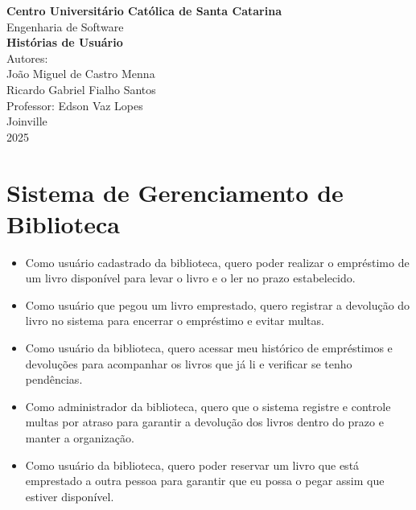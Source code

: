 \documentclass[12pt,a4paper]{article}
\begin{document}
\begin{center}
    \centering

    {\Large \textbf{Centro Universitário Católica de Santa Catarina}}\\[0.5cm]
    {\large Engenharia de Software}\\[4cm]

    {\Huge \textbf{Histórias de Usuário}}\\[0.5cm]

    {\large Autores:}\\[0.5cm]
    {\large João Miguel de Castro Menna}\\[0.5cm]
    {\large Ricardo Gabriel Fialho Santos}\\[4.5cm]

    {\large Professor: Edson Vaz Lopes}\\[0.5cm]

    \vfill
    {\large Joinville}\\
    {\large 2025}
\end{center}

\section*{Sistema de Gerenciamento de Biblioteca}

\begin{itemize}
    \item Como usuário cadastrado da biblioteca, quero poder realizar o empréstimo de um
        livro disponível para levar o livro e o ler no prazo estabelecido.
    \item Como usuário que pegou um livro emprestado, quero registrar a
        devolução do livro no sistema para encerrar o empréstimo e evitar
        multas.
    \item Como usuário da biblioteca, quero acessar meu histórico de empréstimos e devoluções
        para acompanhar os livros que já li e verificar se tenho pendências.
    \item Como administrador da biblioteca, quero que o sistema registre e controle multas
        por atraso para garantir a devolução dos livros dentro do prazo e manter a organização.
    \item Como usuário da biblioteca, quero poder reservar um livro que está emprestado a outra
        pessoa para garantir que eu possa o pegar assim que estiver disponível.
\end{itemize}
\end{document}
